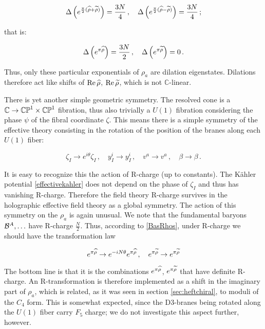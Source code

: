 \begin{equation}
	\Delta \left( e^{\frac{\pi}{2} (\widehat{\rho} + \widetilde{\rho})} \right) = \frac{3N}{4}\,,\quad
	\Delta \left( e^{\frac{\pi}{2} (\widehat{\rho} - \widetilde{\rho})} \right) = \frac{3N}{4}\,;
	\label{}
\end{equation}

that is:

\begin{equation}
	\Delta\left( e^{\pi\widehat{\rho}} \right) = \frac{3N}{2}\,,\quad \Delta\left( e^{\pi\widetilde{\rho}} \right) = 0\,.
\end{equation}

Thus, only these particular exponentials of $\rho_a$ are dilation eigenstates. Dilations therefore act like shifts of $\operatorname{Re} \widehat{\rho}$, $\operatorname{Re} \widetilde{\rho}$, which is not $\mathbb{C}$-linear.

There is yet another simple geometric symmetry. The resolved cone is a $\mathbb{C} \rightarrow \mathbb{CP}^1 \times \mathbb{CP}^1$ fibration, thus also trivially a $U(1)$ fibration considering the phase $\psi$ of the fibral coordinate $\zeta$. This means there is a simple symmetry of the effective theory consisting in the rotation of the position of the branes along each $U(1)$ fiber:

\begin{equation}
	\zeta_I \rightarrow e^{i\theta} \zeta_I\,, \quad y^i_I \rightarrow y^i_I\,, \quad v^a \rightarrow v^a\,,\quad \beta \rightarrow \beta\,.
	\label{}
\end{equation}

It is easy to recognize this the action of R-charge (up to constants). The K\"ahler potential \eqref{effectivekahler} does not depend on the phase of $\zeta_I$ and thus has vanishing R-charge. Therefore the field theory R-charge survives in the holographic effective field theory as a global symmetry. The action of this symmetry on the $\rho_a$ is again unusual. We note that the fundamental baryons $\mathcal{B}^A, \ldots$ have R-charge $\frac{N}{2}$. Thus, according to \eqref{BasRhos}, under R-charge we should have the transformation law

\begin{equation}
	e^{\pi \widehat{\rho}} \rightarrow e^{-iN\theta} e^{\pi\widehat{\rho}}\,,\quad e^{\pi\widetilde{\rho}} \rightarrow e^{\pi\widetilde{\rho}}
	\label{}
\end{equation}

The bottom line is that it is the combinations $e^{\pi \widehat{\rho}}$, $e^{\pi\widetilde{\rho}}$ that have definite R-charge. An R-transformation is therefore implemented as a shift in the imaginary part of $\rho_a$, which is related, as it was seen in section \ref{sec:heftchiral}, to moduli of the $C_4$ form. This is somewhat expected, since the D3-branes being rotated along the $U(1)$ fiber carry $F_5$ charge; we do not investigate this aspect further, however.

